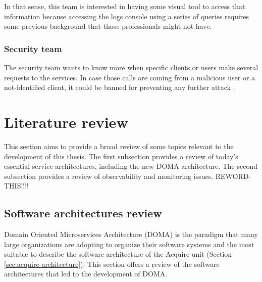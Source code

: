\documentclass[english, 12pt, a4paper, sci, utf8, a-1b, online]{aaltothesis}
\begin{document}
In that sense, this team is interested in having some visual tool to access that information because accessing the logs console using a series of queries requires some previous background that those professionals might not have.

\subsubsection*{Security team}

The security team wants to know more when specific clients or users make several requests to the services. In case those calls are coming from a malicious user or a not-identified client, it could be banned for preventing any further attack \cite{jhaveri2012attacks}.

\clearpage
\section{Literature review}
\label{sec:literature-review}


This section aims to provide a broad review of some topics relevant to the development of this thesis. The first subsection provides a review of today's essential service architectures, including the new DOMA architecture. The second subsection provides a review of observability and monitoring issues. REWORD-THIS!!!!

\subsection{Software architectures review}


Domain Oriented Microservices Architecture (DOMA) is the paradigm that many large organizations are adopting to organize their software systems and the most suitable to describe the software architecture of the Acquire unit (Section  \ref{sec:acquire-architecture}). This section offers a review of the software architectures that led to the development of DOMA.\\
\end{document}
